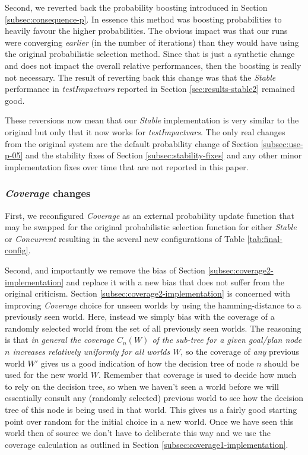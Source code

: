\documentclass[a4paper]{article}
\newcommand{\cc}{\emph{Concurrent}\xspace}
\newcommand{\st}{\emph{Stable}\xspace}
\newcommand{\cov}{\emph{Coverage}\xspace}
\newcommand{\tiv}{\emph{testImpactvars}\xspace}
\newcommand{\dt}{{decision tree}\xspace}
\begin{document}
Second, we reverted back the probability boosting introduced in Section \ref{subsec:consequence-p}. In essence this method was boosting probabilities to heavily favour the higher probabilities. The obvious impact was that our runs were converging \textit{earlier} (in the number of iterations) than they would have using the original probabilistic selection method. Since that is just a synthetic change and does not impact the overall relative performances, then the boosting is really not necessary. The result of reverting back this change was that the \st performance in \tiv reported in Section \ref{sec:results-stable2} remained good.

These reversions now mean that our \st implementation is very similar to the original but only that it now works for \tiv. The only real changes from the original system are the default probability change of Section \ref{subsec:use-p-05} and the stability fixes of Section \ref{subsec:stability-fixes} and any other minor implementation fixes over time that are not reported in this paper.

\subsubsection{\cov changes}

First, we reconfigured \cov as an external probability update function that may be swapped for the original probabilistic selection function for either \st or \cc resulting in the several new configurations of Table \ref{tab:final-config}.

Second, and importantly we remove the bias of Section \ref{subsec:coverage2-implementation} and replace it with a new bias that does not suffer from the original criticism. Section \ref{subsec:coverage2-implementation} is concerned with improving \cov choice for unseen worlds by using the hamming-distance to a previously seen world. Here, instead we simply bias with the coverage of a randomly selected world from the set of all previously seen worlds. The reasoning is that \textit{in general the coverage $C_n(W)$ of the sub-tree for a given goal/plan node $n$ increases relatively uniformly for all worlds $W$}, so the coverage of \textit{any} previous world $W'$ gives us a good indication of how the \dt of node $n$ should be used for the new world $W$. Remember that coverage is used to decide how much to rely on the \dt, so when we haven't seen a world before we will essentially consult any (randomly selected) previous world to see how the \dt of this node is being used in that world. This gives us a fairly good starting point over random for the initial choice in a new world. Once we have seen this world then of source we don't have to deliberate this way and we use the coverage calculation as outlined in Section \ref{subsec:coverage1-implementation}. 
\end{document}
